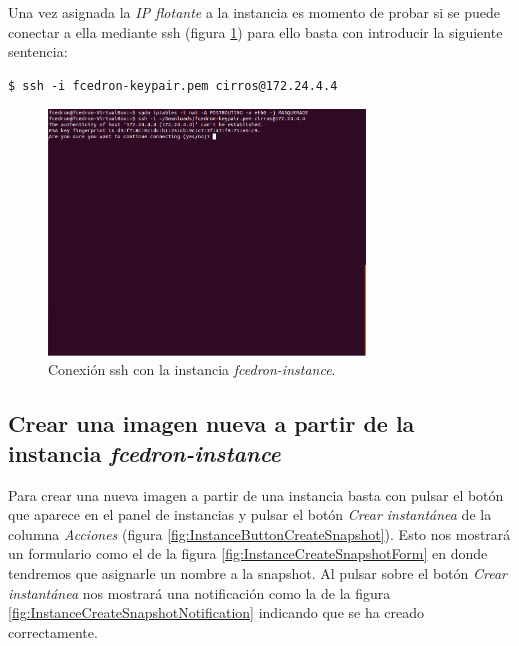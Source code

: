 \documentclass{article}
\begin{document}
	Una vez asignada la \emph{IP flotante} a la instancia es momento de probar si se puede conectar a ella mediante ssh (figura \ref{fig:InstanceSSH}) para ello basta con introducir la siguiente sentencia:
\begin{lstlisting}[style=miniBash]
$ ssh -i fcedron-keypair.pem cirros@172.24.4.4
\end{lstlisting}		

\begin{figure}[h]
  \centering
    \includegraphics[width=0.75\textwidth]{img/m_054.png}
  \caption{Conexión ssh con la instancia \emph{fcedron-instance}.}
  \label{fig:InstanceSSH}
\end{figure}	
	
\clearpage
\subsection{Crear una imagen nueva a partir de la instancia \emph{fcedron-instance}}\label{sec:CreateSnapshot}
	Para crear una nueva imagen a partir de una instancia basta con pulsar el botón que aparece en el panel de instancias y pulsar el botón \emph{Crear instantánea} de la columna \emph{Acciones} (figura \ref{fig:InstanceButtonCreateSnapshot}). Esto nos mostrará un formulario como el de la figura \ref{fig:InstanceCreateSnapshotForm} en donde tendremos que asignarle un nombre a la snapshot. Al pulsar sobre el botón \emph{Crear instantánea} nos mostrará una notificación como la de la figura \ref{fig:InstanceCreateSnapshotNotification} indicando que se ha creado correctamente.
\end{document}
